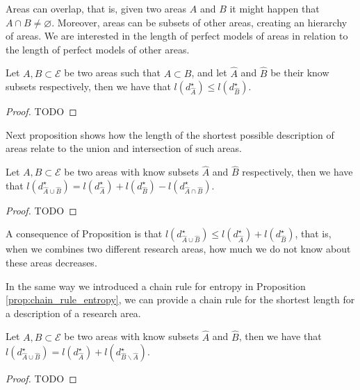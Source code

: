 Areas can overlap, that is, given two areas $A$ and $B$ it might happen that $A \cap B \neq \varnothing$. Moreover, areas can be subsets of other areas, creating an hierarchy of areas. We are interested in the length of perfect models of areas in relation to the length of perfect models of other areas.

\begin{proposition}
Let $A, B \subset \mathcal{E}$ be two areas such that $A \subset B$, and let $\hat{A}$ and $\hat{B}$ be their know subsets respectively, then we have that $l \left( d_{\hat{A}}^{\star} \right) \leq l \left( d_{\hat{B}}^{\star} \right)$.
\end{proposition}
\begin{proof}
{\color{red} TODO}
\end{proof}

Next proposition \label{prop:areas_union} shows how the length of the shortest possible description of areas relate to the union and intersection of such areas.

\begin{proposition}
\label{prop:areas_union}
Let $A, B \subset \mathcal{E}$ be two areas with know subsets $\hat{A}$ and $\hat{B}$ respectively, then we have that $l \left( d_{\hat{A} \cup \hat{B}}^{\star} \right) = l \left( d_{\hat{A}}^{\star} \right) + l \left( d_{\hat{B}}^{\star} \right) - l \left( d_{\hat{A} \cap \hat{B}}^{\star} \right)$.
\end{proposition}
\begin{proof}
{\color{red} TODO}
\end{proof}

A consequence of Proposition \label{prop:areas_union} is that $l \left( d_{\hat{A} \cup \hat{B}}^{\star} \right) \leq l \left( d_{\hat{A}}^{\star} \right) + l \left( d_{\hat{B}}^{\star} \right)$, that is, when we combines two different research areas, how much we do not know about these areas decreases.

In the same way we introduced a chain rule for entropy in Proposition \ref{prop:chain_rule_entropy}, we can provide a chain rule for the shortest length for a description of a research area.

\begin{proposition}
Let $A, B \subset \mathcal{E}$ be two areas with know subsets $\hat{A}$ and $\hat{B}$, then we have that $l \left( d_{\hat{A} \cup \hat{B}}^{\star} \right) = l \left( d_{\hat{A}}^{\star} \right) + l \left( d_{\hat{B} \backslash \hat{A}}^{\star} \right)$.
\end{proposition}
\begin{proof}
{\color{red} TODO}
\end{proof}

